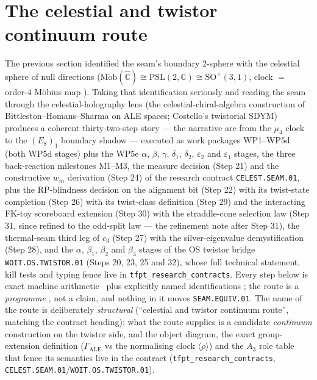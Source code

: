 \section{The celestial and twistor continuum route}\label{sec:celestial}
The previous section identified the seam's boundary $2$-sphere with the celestial sphere of null
directions ($\mathrm{M\ddot{o}b}(\hat{\mathbb C})\cong\mathrm{PSL}(2,\mathbb C)\cong\mathrm{SO}^+(3,1)$,
clock $=$ order-$4$ M\"obius map ). Taking that identification seriously
and reading the seam through the celestial-holography lens (the celestial-chiral-algebra construction of
Bittleston--Homans--Sharma on ALE spaces; Costello's twistorial SDYM) produces a coherent
thirty-two-step
story --- the narrative arc from the $\mu_4$ clock to the $(E_8)_1$ boundary shadow --- executed as
work packages WP1--WP5d (both WP5d stages) plus the WP5e $\alpha$, $\beta$,
$\gamma$, $\delta_1$, $\delta_2$, $\varepsilon_2$ and $\varepsilon_1$ stages, the three back-reaction
milestones M1--M3, the measure decision (Step 21) and the constructive $w_m$ derivation
(Step 24) of the research contract
\texttt{CELEST.SEAM.01}, plus the RP-blindness decision on the alignment bit (Step 22) with its
twist-state completion (Step 26) with its twist-class definition (Step 29)
and the interacting FK-toy scoreboard extension (Step 30) with the straddle-cone
selection law (Step 31, since refined to the odd-split law --- the refinement note after
Step 31), the thermal-seam
third leg of $c_3$ (Step 27) with the silver-eigenvalue demystification (Step 28), and the
$\alpha$, $\beta_1$, $\beta_2$ and $\beta_3$ stages of the OS twistor bridge
\texttt{WOIT.OS.TWISTOR.01} (Steps 20, 23, 25 and 32), whose
full technical statement, kill tests and typing fence live in \texttt{tfpt\_research\_contracts}. Every
step below is exact machine arithmetic \mE\ plus explicitly named identifications \mC; the route is a
\emph{programme} \mO, not a claim, and nothing in it moves \texttt{SEAM.EQUIV.01}. The name of the
route is deliberately \emph{structural} (``celestial and twistor continuum route'', matching the
contract heading): what the route supplies is a candidate \emph{continuum} construction on the twistor
side, and the object diagram, the exact group-extension definition ($\Gamma_{\mathrm{ALE}}$ vs the
normalising clock $\langle\rho\rangle$) and the $A_3$ role table that fence its semantics live in the
contract (\texttt{tfpt\_research\_contracts}, \texttt{CELEST.SEAM.01}/\texttt{WOIT.OS.TWISTOR.01}).

